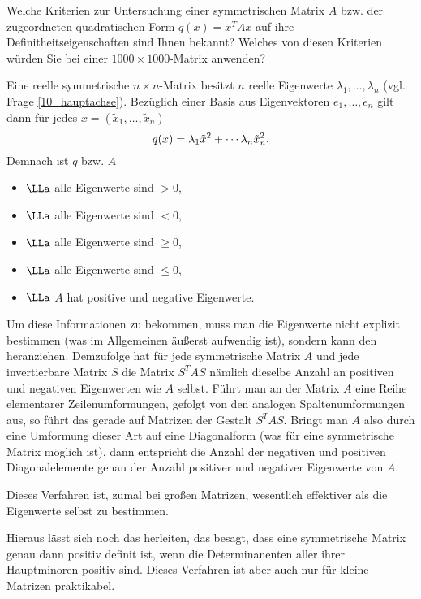 \begin{frage}
  Welche Kriterien zur Untersuchung einer symmetrischen Matrix $A$ bzw. der 
  zugeordneten quadratischen Form $q(x)=x^T A x$ 
  auf ihre Definitheitseigenschaften sind 
  Ihnen bekannt? Welches von diesen Kriterien würden Sie bei einer 
  $1000 \times 1000$-Matrix anwenden?
\end{frage}

\begin{antwort}
  Eine reelle symmetrische $n\times n$-Matrix besitzt $n$ reelle 
  Eigenwerte $\lambda_1,\ldots,\lambda_n$ (vgl. Frage \ref{10_hauptachse}). 
  Bezüglich einer Basis 
  aus Eigenvektoren $\tilde{e}_1, \ldots, \tilde{e}_n$ gilt dann für jedes 
  $x=( \tilde{x}_1, \ldots, \tilde{x}_n )$ 
  \[
  q( x) = \lambda_1 \Tilde{x}^2 + \cdots \lambda_n \Tilde{x}_n^2.
  \]
  Demnach ist $q$ bzw. $A$
  \begin{itemize}
  \item {} $\LLa$ alle Eigenwerte sind $>0$, 
  \item {} $\LLa$ alle Eigenwerte sind $<0$, 
  \item {} $\LLa$ alle Eigenwerte sind $\ge0$, 
  \item {} $\LLa$ alle Eigenwerte sind $\le0$,
  \item {} $\LLa$ $A$ hat positive und negative Eigenwerte.
  \end{itemize}
  Um diese Informationen zu bekommen, muss man die Eigenwerte nicht 
  explizit bestimmen (was im Allgemeinen äußerst aufwendig ist), sondern kann 
  den  heranziehen.
  Demzufolge hat für jede symmetrische Matrix $A$ und jede 
  invertierbare Matrix $S$ die Matrix $S^T A S$ nämlich dieselbe 
  Anzahl an positiven und negativen Eigenwerten 
  wie $A$ selbst. Führt man an der Matrix $A$ 
  eine Reihe elementarer Zeilenumformungen, gefolgt von den analogen 
  Spaltenumformungen aus, so führt das gerade auf Matrizen der Gestalt  
  $S^T A S$. Bringt man $A$ also durch eine Umformung dieser Art  
  auf eine Diagonalform (was für eine symmetrische Matrix möglich ist), 
  dann entspricht die Anzahl der negativen und positiven Diagonalelemente 
  genau der Anzahl positiver und negativer Eigenwerte von $A$. 

  Dieses Verfahren ist, zumal bei großen Matrizen, wesentlich effektiver 
  als die Eigenwerte selbst zu bestimmen. 

  Hieraus lässt sich noch das   
  herleiten, das besagt, dass 
  eine symmetrische Matrix genau dann positiv definit 
  ist, wenn die Determinanenten aller ihrer Hauptminoren 
  positiv sind. Dieses Verfahren ist aber auch nur für kleine 
  Matrizen praktikabel. 
  \AntEnd
  
\end{antwort}


